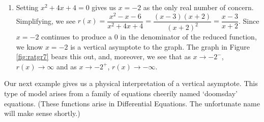 {\begin{enumerate}
\item  Setting $x^2+4x+4 = 0$ gives us $x=-2$ as the only real number of concern.  Simplifying, we see  $r(x) = \dfrac{x^2-x-6}{x^2+4x+4} = \dfrac{(x-3)(x+2)}{(x+2)^2} = \dfrac{x-3}{x+2}$.  Since $x=-2$ continues to produce a $0$ in the denominator of the reduced function, we know $x=-2$ is a vertical asymptote to the graph.  The graph in Figure \ref{fig:ratgr7} bears this out, and, moreover, we see that as $x\rightarrow -2^{-}$, $r(x) \rightarrow \infty$ and as $x \rightarrow -2^{+}$, $r(x) \rightarrow -\infty$.


\end{enumerate}
}

\medskip

Our next example gives us a physical interpretation of a vertical asymptote.  This type of model arises from a family of equations cheerily named `doomsday' equations. (These functions arise in Differential Equations.  The unfortunate name will make sense shortly.)

\medskip

